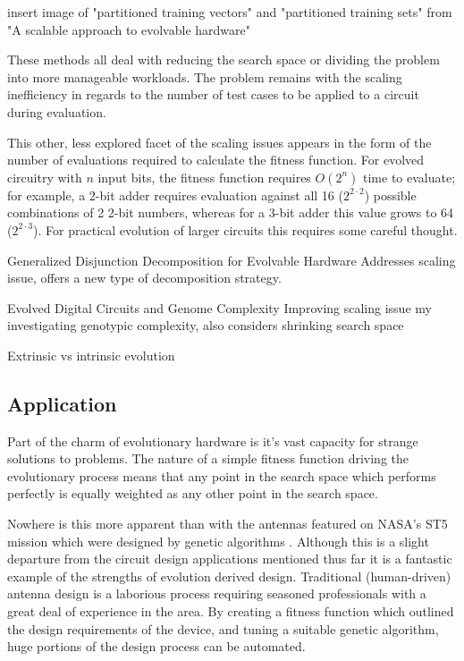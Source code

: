\todo insert image of "partitioned training vectors" and "partitioned training sets" from "A scalable approach to evolvable hardware"

These methods all deal with reducing the search space or dividing the problem into
more manageable workloads. The problem remains with the scaling inefficiency in
regards to the number of test cases to be applied to a circuit during evaluation.

This other, less explored facet of the scaling issues appears in the form of the number of
evaluations required to calculate the fitness function. For evolved circuitry
with $n$ input bits, the fitness function requires $O(2^{n})$ time to evaluate;
for example, a 2-bit adder requires evaluation against all 16 ($2^{2 \cdot 2}$) possible combinations
of 2 2-bit numbers, whereas for a 3-bit adder this value grows to 64 ($2^{2 \cdot 3}$).
For practical evolution of larger circuits this requires some careful thought.

\todo Generalized Disjunction Decomposition for Evolvable Hardware \cite{1703646}
Addresses scaling issue, offers a new type of decomposition strategy.

\todo Evolved Digital Circuits and Genome Complexity \cite{1508485}
Improving scaling issue my investigating genotypic complexity, also considers shrinking search space

\todo Extrinsic vs intrinsic evolution

\subsection{Application}

Part of the charm of evolutionary hardware is it's vast capacity for strange
solutions
to problems. The nature of a simple fitness function driving the evolutionary
process means that any point in the search space which performs perfectly is
equally weighted as any other point in the search space.

Nowhere is this more apparent than with the antennas featured on NASA's ST5 mission
which were designed by genetic algorithms \cite{Antenna}. Although
this is a slight departure from the circuit design applications mentioned thus
far it is a fantastic example of the strengths of evolution derived design.
Traditional (human-driven) antenna design is a laborious process requiring
seasoned professionals with a great deal of experience in the area. By creating
a fitness function which outlined the design requirements of the device, and
tuning a suitable genetic algorithm, huge portions of the design process can
be automated.


